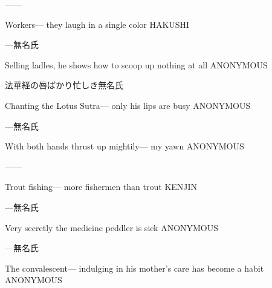 \begin{haiku}
   ---\hfill{---}

    \vin{} Workers---
    \vin{} \vin{} they laugh
    \vin{} \vin{} \vin{} in a single color \hspace{\fill} HAKUSHI
\end{haiku}

\begin{haiku}
    {---}\hfill{\FH 無名氏}

    \vin{} Selling ladles,
    \vin{} \vin{} he shows how to scoop up
    \vin{} \vin{} \vin{} nothing at all \hspace{\fill} ANONYMOUS
\end{haiku}

\begin{haiku}
    {法華経の唇ばかり忙しき}\hfill{\FH 無名氏}

    \vin{} Chanting the Lotus Sutra---
    \vin{} \vin{} only his lips
    \vin{} \vin{} \vin{} are busy \hspace{\fill} ANONYMOUS
\end{haiku}

\begin{haiku}
    {---}\hfill{\FH 無名氏}

    \vin{} With both hands
    \vin{} \vin{} thrust up mightily---
    \vin{} \vin{} \vin{} my yawn \hspace{\fill} ANONYMOUS
\end{haiku}

\begin{haiku}
   ---\hfill{---}

    \vin{} Trout fishing---
    \vin{} \vin{} more fishermen
    \vin{} \vin{} \vin{} than trout \hspace{\fill} KENJIN
\end{haiku}

\begin{haiku}
    {---}\hfill{\FH 無名氏}

    \vin{} Very secretly
    \vin{} \vin{} the medicine peddler
    \vin{} \vin{} \vin{} is sick \hspace{\fill} ANONYMOUS
\end{haiku}

\begin{haiku}
    {---}\hfill{\FH 無名氏}

    \vin{} The convalescent---
    \vin{} \vin{} indulging in his mother's care
    \vin{} \vin{} \vin{} has become a habit \hspace{\fill} ANONYMOUS
\end{haiku}

